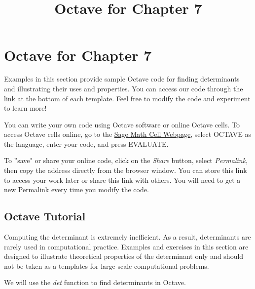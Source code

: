 \documentclass{ximera}
\title{Octave for Chapter 7} \license{CC BY-NC-SA 4.0}
\begin{document}
\begin{abstract}
\end{abstract}
\maketitle

\section*{Octave for Chapter 7}

Examples in this section provide sample Octave code for finding determinants and illustrating their uses and properties. You can access our code through the link at the bottom of each template.  Feel free to modify the code and experiment to learn more!  

You can write your own code using Octave software or online Octave cells.  To access Octave cells online, go to the \href{https://sagecell.sagemath.org/}{Sage Math Cell Webpage}, select OCTAVE as the language, enter your code, and press EVALUATE.  

To ''save" or share your online code, click on the \emph{Share} button, select \emph{Permalink}, then copy the address directly from the browser window.  You can store this link to access your work later or share this link with others.  You will need to get a new Permalink every time you modify the code.

\subsection*{Octave Tutorial}
\begin{warning}
Computing the determinant is extremely inefficient.  As a result, determinants are rarely used in computational practice.  Examples and exercises in this section are designed to illustrate theoretical properties of the determinant only and should not be taken as a templates for large-scale computational problems.
\end{warning}

We will use the \emph{det} function to find determinants in Octave.
\end{document}
